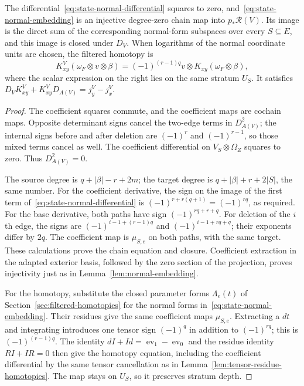 \begin{proposition}
\label{prop:interval-normal-comparison}
The differential~\eqref{eq:state-normal-differential} squares to zero, and~\eqref{eq:state-normal-embedding}
is an injective degree-zero chain map into $p_*\mathcal R(V)$.
Its image is the direct sum of the corresponding normal-form subspaces over every $S\subseteq E$,
and this image is closed under $D_V$.
When logarithms of the normal coordinate units are chosen, the filtered homotopy is
\begin{equation}
\label{eq:state-logarithmic-homotopy}
K_{xy}^V(\omega_F\otimes v\otimes\beta)
=(-1)^{(r-1)q}v\otimes K_{xy}(\omega_F\otimes\beta),
\end{equation}
where the scalar expression on the right lies on the same stratum $U_S$.
It satisfies $D_VK_{xy}^V+K_{xy}^VD_{A(V)}=j_y^V-j_x^V$.
\end{proposition}

\begin{proof}
The coefficient squares commute, and the coefficient maps are cochain maps.
Opposite determinant signs cancel the two-edge terms in $D_{A(V)}^2$;
the internal signs before and after deletion are $(-1)^r$ and $(-1)^{r-1}$, so those mixed terms cancel as well.
The coefficient differential on $V_S\otimes\Omega_Z$ squares to zero.
Thus $D_{A(V)}^2=0$.

The source degree is $q+|\beta|-r+2m$; the target degree is
$q+|\beta|+r+2|S|$, the same number.
For the coefficient derivative, the sign on the image of the first term of~\eqref{eq:state-normal-differential} is
$(-1)^{r+r(q+1)}=(-1)^{rq}$, as required.
For the base derivative, both paths have sign $(-1)^{rq+r+q}$.
For deletion of the $i$th edge, the signs are
$(-1)^{i-1+(r-1)q}$ and $(-1)^{i-1+rq+q}$; their exponents differ by $2q$.
The coefficient map is $\mu_{S,e}$ on both paths, with the same target.
These calculations prove the chain equation and closure.
Coefficient extraction in the adapted exterior basis, followed by the zero section of the projection,
proves injectivity just as in Lemma~\ref{lem:normal-embedding}.

For the homotopy, substitute the closed parameter forms $\Lambda_e(t)$ of Section~\ref{sec:filtered-homotopies}
for the normal forms in~\eqref{eq:state-normal-embedding}.
Their residues give the same coefficient maps $\mu_{S,e}$.
Extracting a $dt$ and integrating introduces one tensor sign $(-1)^q$ in addition to $(-1)^{rq}$;
this is $(-1)^{(r-1)q}$.
The identity $dI+Id=\operatorname{ev}_1-\operatorname{ev}_0$ and the residue identity $RI+IR=0$
then give the homotopy equation, including the coefficient differential by the same tensor cancellation as in
Lemma~\ref{lem:tensor-residue-homotopies}.
The map stays on $U_S$, so it preserves stratum depth.
\end{proof}

